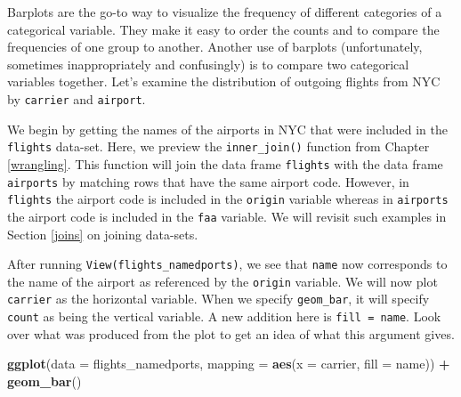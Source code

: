 \documentclass[12pt,]{krantz}
\makeatletter
\newenvironment{Shaded}{\begin{snugshade}}{\end{snugshade}}
\newcommand{\KeywordTok}[1]{\textcolor[rgb]{0.27,0.27,0.27}{\textbf{#1}}}
\newcommand{\DataTypeTok}[1]{\textcolor[rgb]{0.27,0.27,0.27}{#1}}
\newcommand{\StringTok}[1]{\textcolor[rgb]{0.5,0.5,0.5}{#1}}
\newcommand{\OperatorTok}[1]{\textcolor[rgb]{0.43,0.43,0.43}{\textbf{#1}}}
\newcommand{\NormalTok}[1]{#1}
\newenvironment{kframe}{%
\medskip{}
\setlength{\fboxsep}{.8em}
 \def\at@end@of@kframe{}%
 \ifinner\ifhmode%
  \def\at@end@of@kframe{\end{minipage}}%
  \begin{minipage}{\columnwidth}%
 \fi\fi%
 \def\FrameCommand##1{\hskip\@totalleftmargin \hskip-\fboxsep
 \colorbox{shadecolor}{##1}\hskip-\fboxsep
     \hskip-\linewidth \hskip-\@totalleftmargin \hskip\columnwidth}%
 \MakeFramed {\advance\hsize-\width
   \@totalleftmargin\z@ \linewidth\hsize
   \@setminipage}}%
 {\par\unskip\endMakeFramed%
 \at@end@of@kframe}
\renewenvironment{Shaded}{\begin{kframe}}{\end{kframe}}
\theoremstyle{definition}
\theoremstyle{definition}
\theoremstyle{definition}
\theoremstyle{remark}
\makeatother
\begin{document}
Barplots are the go-to way to visualize the frequency of different
categories of a categorical variable. They make it easy to order the
counts and to compare the frequencies of one group to another. Another
use of barplots (unfortunately, sometimes inappropriately and
confusingly) is to compare two categorical variables together. Let's
examine the distribution of outgoing flights from NYC by
\texttt{carrier} and \texttt{airport}.

We begin by getting the names of the airports in NYC that were included
in the \texttt{flights} data-set. Here, we preview the
\texttt{inner\_join()} function from Chapter \ref{wrangling}. This
function will join the data frame \texttt{flights} with the data frame
\texttt{airports} by matching rows that have the same airport code.
However, in \texttt{flights} the airport code is included in the
\texttt{origin} variable whereas in \texttt{airports} the airport code
is included in the \texttt{faa} variable. We will revisit such examples
in Section \ref{joins} on joining data-sets.

\begin{Shaded}
\end{Shaded}

After running \texttt{View(flights\_namedports)}, we see that
\texttt{name} now corresponds to the name of the airport as referenced
by the \texttt{origin} variable. We will now plot \texttt{carrier} as
the horizontal variable. When we specify \texttt{geom\_bar}, it will
specify \texttt{count} as being the vertical variable. A new addition
here is \texttt{fill\ =\ name}. Look over what was produced from the
plot to get an idea of what this argument gives.

\begin{Shaded}
\begin{Highlighting}[]
\KeywordTok{ggplot}\NormalTok{(}\DataTypeTok{data =}\NormalTok{ flights_namedports, }
       \DataTypeTok{mapping =} \KeywordTok{aes}\NormalTok{(}\DataTypeTok{x =}\NormalTok{ carrier, }\DataTypeTok{fill =}\NormalTok{ name)) }\OperatorTok{+}
\StringTok{  }\KeywordTok{geom_bar}\NormalTok{()}
\end{Highlighting}
\end{Shaded}
\end{document}
